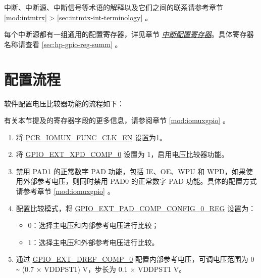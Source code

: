 \documentclass[main\_\_CN.tex]{subfiles}
\begin{document}
\begin{tiplisting}
中断、中断源、中断信号等术语的解释以及它们之间的联系请参考章节 \ref{mod:intmtrx} \textit{} > \ref{sec:intmtx-int-terminology} \textit{}。
\end{tiplisting}

每个中断源都有一组通用的配置寄存器，详见章节 \hyperref[interrupt-config-registers]{\textit{中断配置寄存器}}。具体寄存器名称请查看 \ref{sec:hp-gpio-reg-summ} \textit{}。



\section{配置流程}
\label{sec:anacom-prog-procedures}

软件配置电压比较器功能的流程如下：

\begin{tiplisting}
有关本节提及的寄存器字段的更多信息，请参阅章节 \ref{mod:iomuxgpio} \textit{}。
\end{tiplisting}

\begin{enumerate}
    \item 将 \hyperref[fielddesc:PCRIOMUXFUNCCLKEN]{PCR\_IOMUX\_FUNC\_CLK\_EN} 设置为1。
    \item 将 \hyperref[fielddesc:GPIOEXTXPDCOMP0]{GPIO\_EXT\_XPD\_COMP\_0} 设置为 1，启用电压比较器功能。
    \item 禁用 PAD1 的正常数字 PAD 功能，包括 IE、OE、WPU 和 WPD，如果使用外部参考电压，则同时禁用 PAD0 的正常数字 PAD 功能。具体的配置方式请参考章节 \ref{mod:iomuxgpio} 。
    \item 配置比较模式，将 \hyperref[regdesc:GPIOEXTPADCOMPCONFIG0REG]{GPIO\_EXT\_PAD\_COMP\_CONFIG\_0\_REG}  设置为：
        \begin{itemize}
            \item 0：选择主电压和内部参考电压进行比较；
            \item 1：选择主电压和外部参考电压进行比较。
        \end{itemize}
    \item 通过 \hyperref[fielddesc:GPIOEXTDREFCOMP0]{GPIO\_EXT\_DREF\_COMP\_0}  配置内部参考电压，可调电压范围为 0 \verb+~+ (0.7 × VDDPST1) V，步长为 0.1 × VDDPST1 V。
\end{enumerate}
\end{document}
